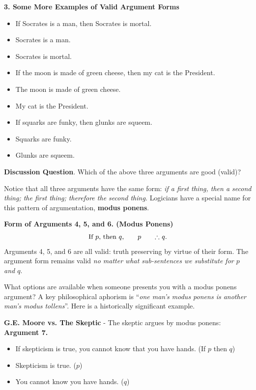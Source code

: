 \documentclass[options]{philosophersimprint}
\theoremstyle{definition}
\begin{document}
\textbf{3. Some More Examples of Valid Argument Forms}

\begin{itemize}
    \item[Arg. 4] If Socrates is a man, then Socrates is mortal.
    \item[] Socrates is a man.
    \item[$\therefore$] Socrates is mortal.
\end{itemize}
\begin{itemize}
    \item[Arg. 5] If the moon is made of green cheese, then my cat is the President.
    \item[] The moon is made of green cheese.
    \item[$\therefore$] My cat is the President.
\end{itemize}
\begin{itemize}
    \item[Arg. 6] If squarks are funky, then glunks are squeem.
    \item[] Squarks are funky.
    \item[$\therefore$] Glunks are squeem.
\end{itemize}

\textbf{Discussion Question}. Which of the above three arguments are good (valid)?

Notice that all three arguments have the same form: \textit{if a first thing, then a second thing; the first thing; therefore the second thing.} Logicians have a special name for this pattern of argumentation, \textbf{modus ponens}.

\textbf{Form of Arguments 4, 5, and 6. (Modus Ponens)}
$$\text{If $p$, then $q$,\qquad $p$\qquad $\therefore$ $q$.}$$
Arguments 4, 5, and 6 are all valid: truth preserving by virtue of their form. The argument form remains valid \textit{no matter what sub-sentences we substitute for $p$ and $q$}.

What options are available when someone presents you with a modus ponens argument? A key philosophical aphorism is ``\textit{one man's modus ponens is another man's modus tollens}''. Here is a historically significant example.

\textbf{G.E. Moore vs. The Skeptic} - The skeptic argues by modus ponens:\\
\textbf{Argument 7.}
\begin{itemize}
    \item[] If skepticism is true, you cannot know that you have hands. (If $p$ then $q$)
    \item[] Skepticism is true. ($p$)
    \item[$\therefore$] You cannot know you have hands. ($q$)
\end{itemize}
\end{document}
